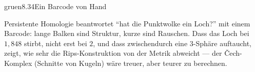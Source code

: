 \begin{loesungkarte}{gruen}{8.34}{Ein Barcode von Hand}
\begin{mitnehmen}\kastentext
Persistente Homologie beantwortet \enquote{hat die Punktwolke ein Loch?} mit einem Barcode: lange Balken sind Struktur, kurze sind Rauschen. Dass das Loch bei $1{,}848$ stirbt, nicht erst bei $2$, und dass zwischendurch eine $3$-Sphäre auftaucht, zeigt, wie sehr die Rips-Konstruktion von der Metrik abweicht --- der Čech-Komplex (Schnitte von Kugeln) wäre treuer, aber teurer zu berechnen.
\end{mitnehmen}
\end{loesungkarte}

